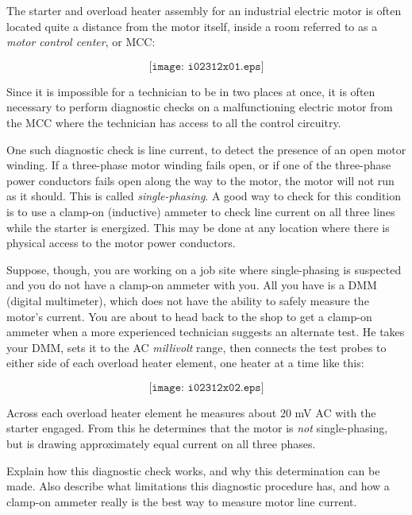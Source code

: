 

The starter and overload heater assembly for an industrial electric motor is often located quite a distance from the motor itself, inside a room referred to as a {\it motor control center}, or MCC:

$$\texttt{[image: i02312x01.eps]}$$

Since it is impossible for a technician to be in two places at once, it is often necessary to perform diagnostic checks on a malfunctioning electric motor from the MCC where the technician has access to all the control circuitry.

One such diagnostic check is line current, to detect the presence of an open motor winding.  If a three-phase motor winding fails open, or if one of the three-phase power conductors fails open along the way to the motor, the motor will not run as it should.  This is called {\it single-phasing}.  A good way to check for this condition is to use a clamp-on (inductive) ammeter to check line current on all three lines while the starter is energized.  This may be done at any location where there is physical access to the motor power conductors.

\goodbreak

Suppose, though, you are working on a job site where single-phasing is suspected and you do not have a clamp-on ammeter with you.  All you have is a DMM (digital multimeter), which does not have the ability to safely measure the motor's current.  You are about to head back to the shop to get a clamp-on ammeter when a more experienced technician suggests an alternate test.  He takes your DMM, sets it to the AC {\it millivolt} range, then connects the test probes to either side of each overload heater element, one heater at a time like this:

$$\texttt{[image: i02312x02.eps]}$$

Across each overload heater element he measures about 20 mV AC with the starter engaged.  From this he determines that the motor is {\it not} single-phasing, but is drawing approximately equal current on all three phases.

Explain how this diagnostic check works, and why this determination can be made.  Also describe what limitations this diagnostic procedure has, and how a clamp-on ammeter really is the best way to measure motor line current.

